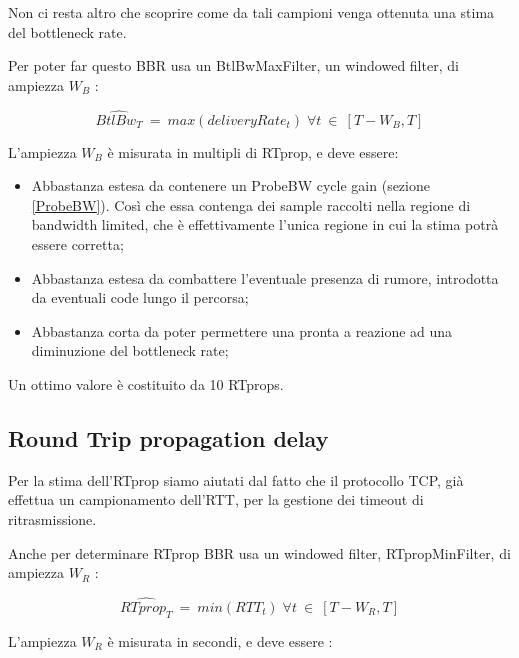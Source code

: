 Non ci resta altro che scoprire come da tali campioni venga ottenuta una stima del bottleneck rate. \bigskip

Per poter far questo BBR usa un BtlBwMaxFilter, un windowed filter, di ampiezza $ W_{B} $ :

\[
	\widehat{BtlBw_{T}} \: = \: max(deliveryRate_{t}) \; \forall t\: \in \: [T-W_{B},T]  
\]

L'ampiezza $ W_{B} $ è misurata in multipli di RTprop, e deve essere:

\begin{itemize}

\item Abbastanza estesa da contenere un ProbeBW cycle gain (sezione \ref{ProbeBW}). Così che essa contenga dei sample raccolti nella regione di bandwidth limited, che è effettivamente l'unica regione in cui la stima potrà essere corretta;

\item Abbastanza estesa da combattere l'eventuale presenza di rumore, introdotta da eventuali code lungo il percorsa;

\item Abbastanza corta da poter permettere una pronta a reazione ad una diminuzione del bottleneck rate;

\end{itemize} 

Un ottimo valore è costituito da 10 RTprops. \cite[p.~61]{Cardwell:2017:BCC:3042068.3009824}

\subsection{Round Trip propagation delay}

Per la stima dell'RTprop siamo aiutati dal fatto che il protocollo TCP, già effettua un campionamento dell'RTT, per la gestione dei timeout di ritrasmissione. \bigskip

Anche per determinare RTprop BBR usa un windowed filter, RTpropMinFilter, di ampiezza $ W_{R} $ :

\[
	\widehat{RTprop_{T}} \: = \: min(RTT_{t}) \; \forall t\: \in \: [T-W_{R},T]  
\]

L'ampiezza $ W_{R} $ è misurata in secondi, e deve essere :

